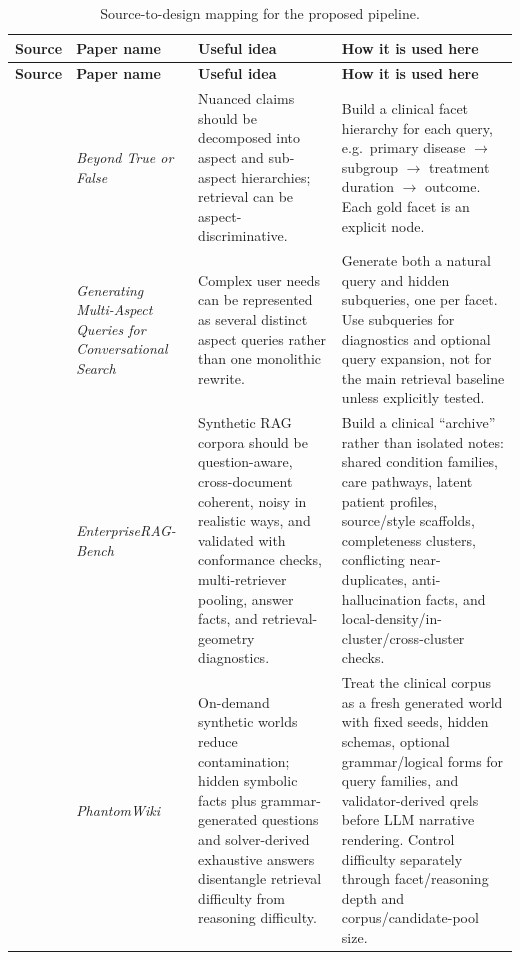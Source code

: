 \documentclass[11pt,a4paper]{article}
\begin{document}
\begin{longtable}{@{}p{2.25cm}p{3.65cm}p{4.2cm}p{4.6cm}@{}}
	\caption{Source-to-design mapping for the proposed pipeline.}\\
	\toprule
	\textbf{Source} & \textbf{Paper name} & \textbf{Useful idea} & \textbf{How it is used here}\\
	\midrule
	\endfirsthead
	\toprule
	\textbf{Source} & \textbf{Paper name} & \textbf{Useful idea} & \textbf{How it is used here}\\
	\midrule
	\endhead
	\bottomrule
	\endfoot
	\citet{kargupta2025claimspect} & \emph{Beyond True or False} & Nuanced claims should be decomposed into aspect and sub-aspect hierarchies; retrieval can be aspect-discriminative. & Build a clinical facet hierarchy for each query, e.g.\ primary disease $\rightarrow$ subgroup $\rightarrow$ treatment duration $\rightarrow$ outcome. Each gold facet is an explicit node.\\
	\citet{abbasiantaeb2026multiaspect} & \emph{Generating Multi-Aspect Queries for Conversational Search} & Complex user needs can be represented as several distinct aspect queries rather than one monolithic rewrite. & Generate both a natural query and hidden subqueries, one per facet. Use subqueries for diagnostics and optional query expansion, not for the main retrieval baseline unless explicitly tested.\\
	\citet{sun2026enterpriseragbench} & \emph{EnterpriseRAG-Bench} & Synthetic RAG corpora should be question-aware, cross-document coherent, noisy in realistic ways, and validated with conformance checks, multi-retriever pooling, answer facts, and retrieval-geometry diagnostics. & Build a clinical ``archive'' rather than isolated notes: shared condition families, care pathways, latent patient profiles, source/style scaffolds, completeness clusters, conflicting near-duplicates, anti-hallucination facts, and local-density/in-cluster/cross-cluster checks.\\
	\citet{gong2025phantomwiki} & \emph{PhantomWiki} & On-demand synthetic worlds reduce contamination; hidden symbolic facts plus grammar-generated questions and solver-derived exhaustive answers disentangle retrieval difficulty from reasoning difficulty. & Treat the clinical corpus as a fresh generated world with fixed seeds, hidden schemas, optional grammar/logical forms for query families, and validator-derived qrels before LLM narrative rendering. Control difficulty separately through facet/reasoning depth and corpus/candidate-pool size.\\

\end{longtable}
\end{document}
